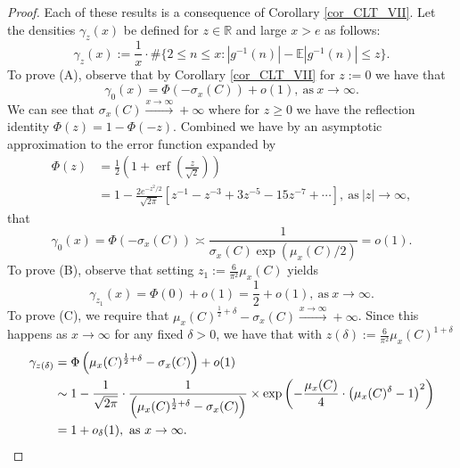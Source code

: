 \documentclass[11pt,reqno,a4letter]{article}
\numberwithin{figure}{section}
\numberwithin{table}{section}
\theoremstyle{plain}
\numberwithin{theorem}{section}
\theoremstyle{definition}
\begin{document}
\begin{proof} 
Each of these results is a consequence of Corollary \ref{cor_CLT_VII}. 
Let the densities $\gamma_z(x)$ be defined for $z \in \mathbb{R}$ and 
large $x > e$ as follows: 
\[
\gamma_z(x) := \frac{1}{x} \cdot \#\{2 \leq n \leq x: |g^{-1}(n)| - \mathbb{E}|g^{-1}(n)| \leq z\}. 
\]
To prove (A), observe that by Corollary \ref{cor_CLT_VII} for $z := 0$ we have that 
\[
\gamma_0(x) = \Phi\left(-\sigma_x(C)\right) + o(1), \mathrm{\ as\ } x \rightarrow \infty. 
\]
We can see that $\sigma_x(C) \xrightarrow{x \rightarrow \infty} +\infty$ where for $z \geq 0$ we have the 
reflection identity $\Phi(z) = 1 - \Phi(-z)$. Combined we have by an asymptotic approximation 
to the error function expanded by 
\begin{align*} 
\Phi(z) & = \frac{1}{2}\left(1 + \operatorname{erf}\left(\frac{z}{\sqrt{2}}\right)\right) \\ 
     & = 1 - \frac{2e^{-z^2/2}}{\sqrt{2\pi}}\left[ 
     z^{-1} - z^{-3} + 3z^{-5} - 15z^{-7} + \cdots 
     \right], \mathrm{\ as\ } |z| \rightarrow \infty, 
\end{align*} 
that 
\[
\gamma_0(x) = \Phi\left(-\sigma_x(C)\right) \asymp \frac{1}{\sigma_x(C) \exp(\mu_x(C)/2)} = o(1). 
\]
To prove (B), observe that setting $z_1 := \frac{6}{\pi^2} \mu_x(C)$ yields 
\[
\gamma_{z_1}(x) = \Phi(0) + o(1) = \frac{1}{2} + o(1), \mathrm{\ as\ } x \rightarrow \infty. 
\]
To prove (C), we require that 
$\mu_x(C)^{\frac{1}{2} + \delta} - \sigma_x(C) \xrightarrow{x \rightarrow \infty} +\infty$. 
Since this happens as $x \rightarrow \infty$ for any fixed $\delta > 0$, we have that 
with $z(\delta) := \frac{6}{\pi^2} \mu_x(C)^{1 + \delta}$ 
\begin{align*} 
\gamma_{z(\delta)} & = \Phi\left(\mu_x(C)^{\frac{1}{2} + \delta} - \sigma_x(C)\right) + o(1) \\ 
     & \sim 1 - \frac{1}{\sqrt{2\pi}} \cdot \frac{1}{\left(\mu_x(C)^{\frac{1}{2} + \delta} - \sigma_x(C)\right)} \times 
     \exp\left(-\frac{\mu_x(C)}{4} \cdot \left(\mu_x(C)^{\delta} - 1\right)^2\right) \\ 
     & = 1 + o_{\delta}(1), \mathrm{\ as\ } x \rightarrow \infty. 
     \qedhere 
\end{align*} 
\end{proof} 
\end{document}
